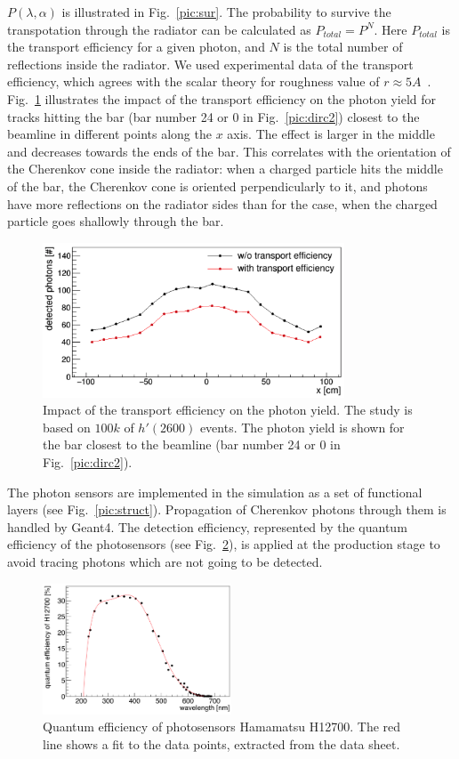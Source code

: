 $P(\lambda,\alpha)$ is illustrated in Fig.~\ref{pic:sur}. The probability to survive the transpotation through the radiator can be calculated as $P_{total} = P^{N}$. Here $P_{total}$ is the transport efficiency for a given photon, and $N$ is the total number of reflections inside the radiator. We used experimental data of the transport efficiency, which agrees with the scalar theory for roughness value of $r \approx 5 A$~\cite{roughness}. Fig.~\ref{pic:tra} illustrates the impact of the transport efficiency on the photon yield for tracks hitting the bar (bar number 24 or 0 in Fig.~\ref{pic:dirc2}) closest to the beamline in different points along the $x$ axis. The effect is larger in the middle and decreases towards the ends of the bar. This correlates with the orientation of the Cherenkov cone inside the radiator: when a charged particle hits the middle of the bar, the Cherenkov cone is oriented perpendicularly to it, and photons have more reflections on the radiator sides than for the case, when the charged particle goes shallowly through the bar.

\begin{figure}[!h]
\centering
\includegraphics[width=0.8\textwidth]{pics/transport.png}
\caption{\label{pic:tra}
Impact of the transport efficiency on the photon yield. The study is based on $100k$ of $h'(2600)$ events. The photon yield is shown for the bar closest to the beamline (bar number 24 or 0 in Fig.~\ref{pic:dirc2}).
}
\end{figure}

The photon sensors are implemented in the simulation as a set of functional layers (see Fig.~\ref{pic:struct}). Propagation of Cherenkov photons through them is handled by Geant4. The detection efficiency, represented by the quantum efficiency of the photosensors (see Fig.~\ref{pic:qe}), is applied at the production stage to avoid tracing photons which are not going to be detected.

\begin{figure}[tb]
\centering
\includegraphics[width=0.5\textwidth]{pics/qe.png}
\caption{\label{pic:qe}
Quantum efficiency of photosensors Hamamatsu H12700. The red line shows a fit to the data points, extracted from the data sheet.
}
\end{figure}

